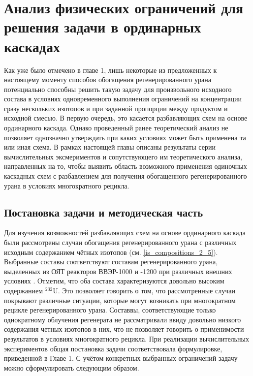 \chapter{Анализ физических ограничений для решения задачи в ординарных каскадах}\label{ch:ch2}

Как уже было отмечено в главе 1, лишь некоторые из предложенных к настоящему моменту способов обогащения регенерированного урана потенциально способны решить такую задачу для произвольного исходного состава в условиях одновременного выполнения ограничений на концентрации сразу нескольких изотопов и при заданной пропорции между продуктом и исходной смесью. В первую очередь, это касается разбавляющих схем на основе ординарного каскада. 
Однако проведенный ранее теоретический анализ не позволяет однозначно утверждать при каких условиях может быть применена та или иная схема. В рамках настоящей главы описаны результаты серии вычислительных эксмериментов и сопутствующего им теоретического анализа, направленных на то, чтобы выявить область возможного применения одиночных каскадных схем с разбавлением для получения обогащенного регенерированного урана в условиях многократного рецикла. 


\section{Постановка задачи и методическая часть}

Для изучения возможностей разбавляющих схем на основе ординарного каскада были рассмотрены случаи обогащения регенерированного урана с различных исходным содержанием чётных изотопов (см. \ref{is_compositions_2_5}). Выбранные составы соответствуют составам регенерированного урана, выделенных из ОЯТ реакторов ВВЭР-1000 и -1200 при различных внешних условиях \cite{palkinDesignanalyticalResearchRefinement2010,nevinicaToplivnyyCiklLegkovodnogo2019}. Отметим, что оба состава характеризуются довольно высоким содержанием $^{232}$U. Это позволяет говорить о том, что рассмотренные случаи покрывают различные ситуации, которые могут возникать при многократном рецикле регенерированного урана. Составвы, соответствующие только однократному облучения регенерата не рассматривали ввиду довольно низкого содержания четных изотопов в них, что не позволяет говорить о применимости результатов в условиях многократного рецикла. 
При реализации вычислительных экспериментов общая постановка задачи соответствовала формулировке, приведенной в Главе 1. С учётом конкретных выбранных ограничений задачу можно сформулировать следующим образом.

